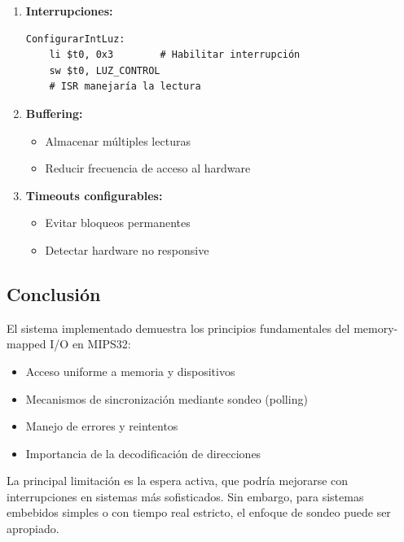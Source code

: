 \documentclass[12pt,a4paper]{article}
\begin{document}
\begin{enumerate}
    \item \textbf{Interrupciones:}
    \begin{lstlisting}[style=mipsstyle]
ConfigurarIntLuz:
    li $t0, 0x3        # Habilitar interrupción
    sw $t0, LUZ_CONTROL
    # ISR manejaría la lectura
    \end{lstlisting}
    
    \item \textbf{Buffering:}
    \begin{itemize}
        \item Almacenar múltiples lecturas
        \item Reducir frecuencia de acceso al hardware
    \end{itemize}
    
    \item \textbf{Timeouts configurables:}
    \begin{itemize}
        \item Evitar bloqueos permanentes
        \item Detectar hardware no responsive
    \end{itemize}
\end{enumerate}

\subsection{Conclusión}
El sistema implementado demuestra los principios fundamentales del memory-mapped I/O en MIPS32:
\begin{itemize}
    \item Acceso uniforme a memoria y dispositivos
    \item Mecanismos de sincronización mediante sondeo (polling)
    \item Manejo de errores y reintentos
    \item Importancia de la decodificación de direcciones
\end{itemize}

La principal limitación es la espera activa, que podría mejorarse con interrupciones en sistemas más sofisticados. Sin embargo, para sistemas embebidos simples o con tiempo real estricto, el enfoque de sondeo puede ser apropiado.
\end{document}
